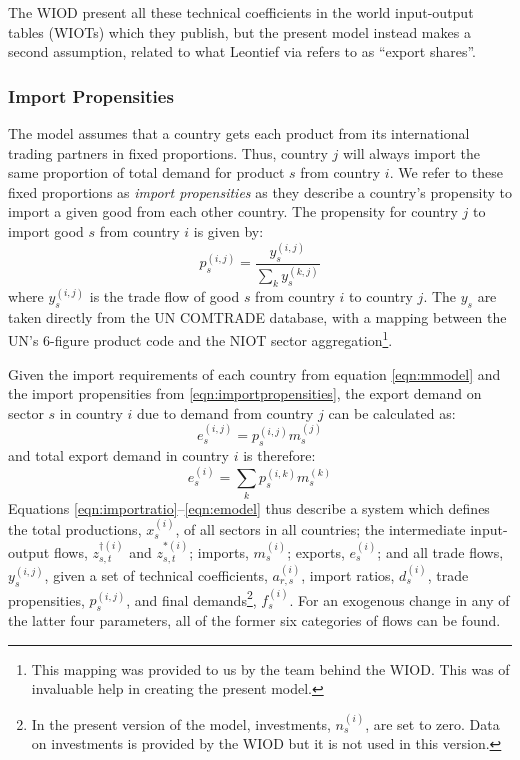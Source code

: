 \documentclass[a4paper]{article}
\begin{document}
The WIOD present all these technical coefficients in the world input-output tables (WIOTs) which they publish, but the present model instead makes a second assumption, related to what Leontief via \textcite{duchin_international_2004} refers to as ``export shares''.

\subsubsection*{Import Propensities}
The model assumes that a country gets each product from its international trading partners in fixed proportions.
Thus, country $j$ will always import the same proportion of total demand for product $s$ from country $i$.
We refer to these fixed proportions as \textit{import propensities} as they describe a country's propensity to import a given good from each other country.
The propensity for country $j$ to import good $s$ from country $i$ is given by:
\begin{equation}\label{eqn:importpropensities}
p^{(i,j)}_s = \frac{y^{(i,j)}_s}{\sum_k{y^{(k,j)}_s}}
\end{equation}
where $y^{(i,j)}_s$ is the trade flow of good $s$ from country $i$ to country $j$. The $y_s$ are taken directly from the UN COMTRADE database, with a mapping between the UN's 6-figure product code and the NIOT sector aggregation\footnote{This mapping was provided to us by the team behind the WIOD. This was of invaluable help in creating the present model.}.

Given the import requirements of each country from equation \eqref{eqn:mmodel} and the import propensities from \eqref{eqn:importpropensities}, the export demand on sector $s$ in country $i$ due to demand from country $j$ can be calculated as:
\begin{equation*}
e_s^{(i,j)} = p_s^{(i,j)}m_s^{(j)}
\end{equation*}
and total export demand in country $i$ is therefore:
\begin{equation}\label{eqn:emodel}
e_s^{(i)} = \sum_k{p_s^{(i,k)}m_s^{(k)}}
\end{equation}
\noindent Equations \eqref{eqn:importratio}--\eqref{eqn:emodel} thus describe a system which defines the total productions, $x_s^{(i)}$, of all sectors in all countries; the intermediate input-output flows, $z_{s,t}^{\dagger(i)}$ and $z_{s,t}^{*(i)}$; imports, $m_s^{(i)}$; exports, $e_s^{(i)}$; and all trade flows, $y_s^{(i,j)}$, given a set of technical coefficients, $a_{r,s}^{(i)}$, import ratios, $d_s^{(i)}$, trade propensities, $p_s^{(i,j)}$, and final demands\footnote{In the present version of the model, investments, $n_s^{(i)}$, are set to zero. 
Data on investments is provided by the WIOD but it is not used in this version.}, $f_s^{(i)}$. For an exogenous change in any of the latter four parameters, all of the former six categories of flows can be found.
\end{document}
